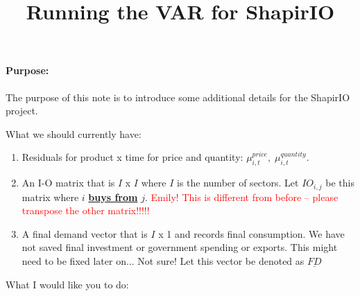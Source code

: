 \documentclass[12pt,english]{article}
\begin{document}


\title{Running the VAR for ShapirIO}
\maketitle

\paragraph{Purpose:} The purpose of this note is to introduce some additional details for the ShapirIO project.

What we should currently have:

\begin{enumerate}
	\item Residuals for product x time for price and quantity: $\mu_{i,t}^{price},\;\mu_{i,t}^{quantity}$.
	\item An I-O matrix that is $I$ x $I$ where $I$ is the number of sectors. Let $IO_{i,j}$ be this matrix where $i$ {\bf \underline{buys from}} $j$. \textcolor{red}{Emily! This is different from before -- please transpose the other matrix!!!!!}
	\item A final demand vector that is $I$ x 1 and records final consumption. We have not saved final investment or government spending or exports. This might need to be fixed later on... Not sure! Let this vector be denoted as $\underline{FD}$
\end{enumerate}

What I would like you to do:
\end{document}
